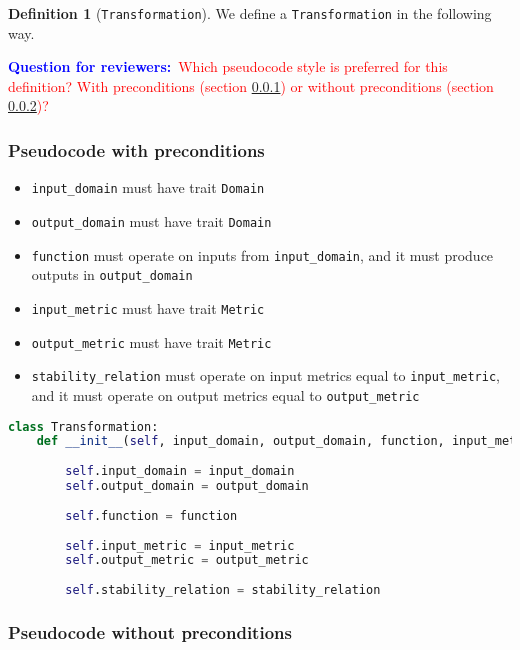 \documentclass[11pt,a4paper]{article}
\theoremstyle{definition}
\newtheorem{definition}{Definition}[section]
\newcommand{\questionr}[1]{\textcolor{blue}{\textbf{Question for reviewers:}}\textcolor{red}{~#1}}
\begin{document}
\begin{definition}[\texttt{Transformation}]
    We define a \texttt{Transformation} in the following way.
    
    \questionr{Which pseudocode style is preferred for this definition? With preconditions (section \ref{sec:pseudocode-w-preconditions}) or without preconditions (section \ref{sec:pseudocode-wout-preconditions})?}
    
\subsubsection{Pseudocode with preconditions}
\label{sec:pseudocode-w-preconditions}

\begin{itemize}
    \item \texttt{input\_domain} must have trait \texttt{Domain}
    \item \texttt{output\_domain} must have trait \texttt{Domain}
    \item \texttt{function} must operate on inputs from \texttt{input\_domain}, and it must produce outputs in \texttt{output\_domain}
    \item \texttt{input\_metric} must have trait \texttt{Metric}
    \item \texttt{output\_metric} must have trait \texttt{Metric}
    \item \texttt{stability\_relation} must operate on input metrics equal to \texttt{input\_metric}, and it must operate on output metrics equal to \texttt{output\_metric}
\end{itemize}

\begin{lstlisting}[language=Python]
class Transformation:
    def __init__(self, input_domain, output_domain, function, input_metric, output_metric, stability_relation):
    	
        self.input_domain = input_domain
        self.output_domain = output_domain
        
        self.function = function
        
        self.input_metric = input_metric
        self.output_metric = output_metric
        
        self.stability_relation = stability_relation
\end{lstlisting}
    
\subsubsection{Pseudocode without preconditions}
\label{sec:pseudocode-wout-preconditions}


\end{definition}
\end{document}
